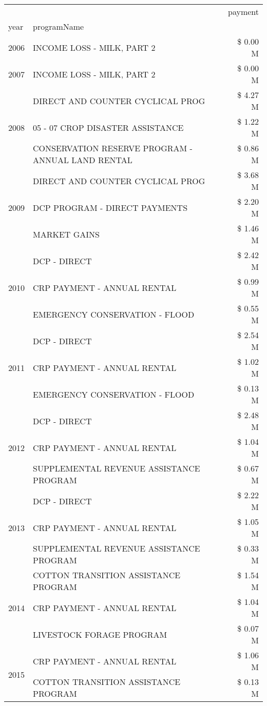 \begin{tabular}{llr}
\toprule
 &  & payment \\
year & programName &  \\
\midrule
2006 & INCOME LOSS - MILK, PART 2 & \$ 0.00 M \\
\cline{1-3}
2007 & INCOME LOSS - MILK, PART 2 & \$ 0.00 M \\
\cline{1-3}
\multirow[t]{3}{*}{2008} & DIRECT AND COUNTER CYCLICAL PROG & \$ 4.27 M \\
 & 05 - 07 CROP DISASTER ASSISTANCE & \$ 1.22 M \\
 & CONSERVATION RESERVE PROGRAM - ANNUAL LAND RENTAL & \$ 0.86 M \\
\cline{1-3}
\multirow[t]{3}{*}{2009} & DIRECT AND COUNTER CYCLICAL PROG & \$ 3.68 M \\
 & DCP PROGRAM - DIRECT PAYMENTS & \$ 2.20 M \\
 & MARKET GAINS & \$ 1.46 M \\
\cline{1-3}
\multirow[t]{3}{*}{2010} & DCP - DIRECT & \$ 2.42 M \\
 & CRP PAYMENT - ANNUAL RENTAL & \$ 0.99 M \\
 & EMERGENCY CONSERVATION - FLOOD & \$ 0.55 M \\
\cline{1-3}
\multirow[t]{3}{*}{2011} & DCP - DIRECT & \$ 2.54 M \\
 & CRP PAYMENT - ANNUAL RENTAL & \$ 1.02 M \\
 & EMERGENCY CONSERVATION - FLOOD & \$ 0.13 M \\
\cline{1-3}
\multirow[t]{3}{*}{2012} & DCP - DIRECT & \$ 2.48 M \\
 & CRP PAYMENT - ANNUAL RENTAL & \$ 1.04 M \\
 & SUPPLEMENTAL REVENUE ASSISTANCE PROGRAM & \$ 0.67 M \\
\cline{1-3}
\multirow[t]{3}{*}{2013} & DCP - DIRECT & \$ 2.22 M \\
 & CRP PAYMENT - ANNUAL RENTAL & \$ 1.05 M \\
 & SUPPLEMENTAL REVENUE ASSISTANCE PROGRAM & \$ 0.33 M \\
\cline{1-3}
\multirow[t]{3}{*}{2014} & COTTON TRANSITION ASSISTANCE PROGRAM & \$ 1.54 M \\
 & CRP PAYMENT - ANNUAL RENTAL & \$ 1.04 M \\
 & LIVESTOCK FORAGE PROGRAM & \$ 0.07 M \\
\cline{1-3}
\multirow[t]{3}{*}{2015} & CRP PAYMENT - ANNUAL RENTAL & \$ 1.06 M \\
 & COTTON TRANSITION ASSISTANCE PROGRAM & \$ 0.13 M \\

\end{tabular}
